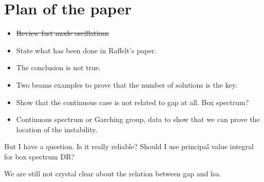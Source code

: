 \documentclass[%
 reprint,
 amsmath,amssymb,
 aps,
 prd
]{revtex4-1}
\begin{document}

\appendix
\section{\label{sec-outline}Plan of the paper}



\begin{itemize}
    \item \sout{Review fast mode oscillations}
    \item State what has been done in Raffelt's paper.
    \item The conclusion is not true.
    \item Two beams examples to prove that the number of solutions is the key.
    \item Show that the continuous case is not related to gap at all. Box spectrum?
    \item Continuous spectrum or Garching group, data to show that we can prove the location of the instability.
\end{itemize}


But I have a question. Is it really reliable? Should I use principal value integral for box spectrum DR?

We are still not crystal clear about the relation between gap and lsa.







\end{document}
